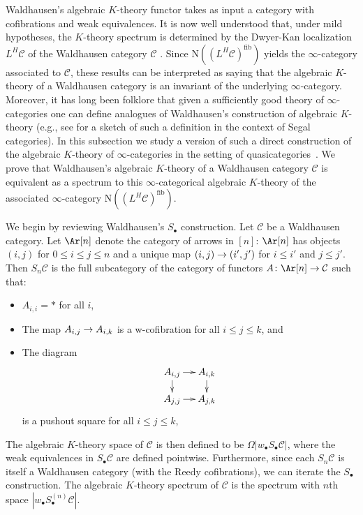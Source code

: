 \documentclass{amsart}
\newcommand{\ssdot}{\bullet}%
\newcommand{\subdot}{_\ssdot}
\newcommand{\Sdot}[1][\ssdot]{S_{#1}}
\renewcommand{\to}{\mathchoice{\longrightarrow}{\rightarrow}{\rightarrow}{\rightarrow}}
\let\catsymbfont\mathcal
\newcommand{\aC}{{\catsymbfont{C}}}
\newcommand{\A}{\mathcal{A}}
\newcommand{\N}{\mathrm{N}}
\renewcommand{\i}{\infty}
\numberwithin{equation}{section}
\theoremstyle{definition}
\begin{document}
Waldhausen's algebraic $K$-theory functor takes as input a category
with cofibrations and weak equivalences.  It is now well understood
that, under mild hypotheses, the $K$-theory spectrum is determined by the Dwyer-Kan
localization $L^H\aC$ of the Waldhausen category
$\aC$ \cite{ToenVezzosi, BM4, Cisinski}.  Since
$\N((L^H \aC)^{\textrm{fib}})$ yields the $\i$-category associated to
$\aC$, these results can be interpreted as saying that the algebraic
$K$-theory of a Waldhausen category is an invariant of the underlying
$\i$-category.
Moreover, it has long been folklore that given a sufficiently good
theory of $\i$-categories one can define analogues of Waldhausen's
construction of algebraic $K$-theory (e.g., see \cite[\S
7]{ToenVezzosi} for a sketch of such a definition in the context of
Segal categories).  In this subsection we study a version of such a
direct construction of the algebraic $K$-theory of $\i$-categories in
the setting of quasicategories~\cite[1.2.2.5]{HAG}.  We prove that
Waldhausen's algebraic $K$-theory of a Waldhausen category $\aC$ is
equivalent as a spectrum to this $\i$-categorical algebraic $K$-theory
of the associated $\i$-category $\N((L^H \aC)^{\mathrm{fib}})$.

We begin by reviewing Waldhausen's $\Sdot$ construction.  Let $\aC$ be
a Waldhausen category.  Let $\Ar[n]$ denote the category of arrows in
$[n]$:  $\Ar[n]$ has objects $(i,j)$ for $0\leq i\leq j\leq n$ and a
unique map $(i,j)\to (i',j')$ for $i\leq i'$ and $j\leq j'$.  
Then $\Sdot[n]\aC$ is the full subcategory of the
category of functors $A\colon \Ar[n]\to \aC$ such that:
\begin{itemize}
\item $A_{i,i}=*$ for all $i$, 
\item The map $A_{i,j}\to A_{i,k}$ is a w-cofibration for all $i \leq
j \leq k$, and
\item The diagram
\[  \xymatrix@-1pc{%
A_{i,j}\ar[r]\ar[d]&A_{i,k}\ar[d]\\A_{j,j}\ar[r]&A_{j,k}
} \]
is a pushout square for all $i \leq j \leq k$, 
\end{itemize}

The algebraic $K$-theory space of $\aC$ is then defined to be $\Omega
|w\subdot \Sdot \aC|$, where the weak equivalences in $\Sdot \aC$ are
defined pointwise.  Furthermore, since each $\Sdot[n] \aC$ is itself a
Waldhausen category (with the Reedy cofibrations), we can iterate the
$\Sdot$ construction.  The algebraic $K$-theory spectrum of $\aC$ is
the spectrum with $n$th space $|w\subdot \Sdot^{(n)} \aC|$.
\end{document}
